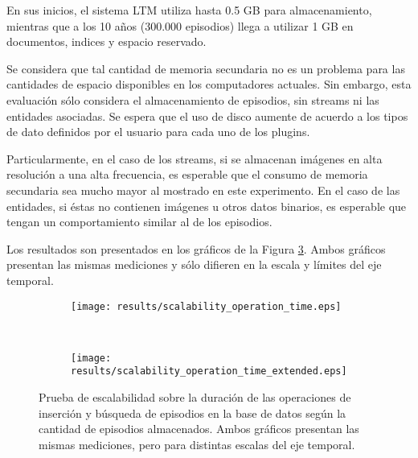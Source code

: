 En sus inicios, el sistema LTM utiliza hasta 0.5 GB para almacenamiento, mientras que a los 10 años (300.000 episodios) llega a utilizar 1 GB en documentos, indices y espacio reservado. 

Se considera que tal cantidad de memoria secundaria no es un problema para las cantidades de espacio disponibles en los computadores actuales. Sin embargo, esta evaluación sólo considera el almacenamiento de episodios, sin streams ni las entidades asociadas. Se espera que el uso de disco aumente de acuerdo a los tipos de dato definidos por el usuario para cada uno de los plugins. 

Particularmente, en el caso de los streams, si se almacenan imágenes en alta resolución a una alta frecuencia, es esperable que el consumo de memoria secundaria sea mucho mayor al mostrado en este experimento. En el caso de las entidades, si éstas no contienen imágenes u otros datos binarios, es esperable que tengan un comportamiento similar al de los episodios.



 Los resultados son presentados en los gráficos de la Figura \ref{result:scalability_time_usage}. Ambos gráficos presentan las mismas mediciones y sólo difieren en la escala y límites del eje temporal.

\begin{figure}[!ht]
	\centering
	\begin{subfigure}[b]{\graphwidth\textwidth}
		\texttt{[image: results/scalability\_operation\_time.eps]}
		\caption{}
		\label{result:scalability_time_usage_normal}
	\end{subfigure}
	~
	\begin{subfigure}[b]{\graphwidth\textwidth}
		\texttt{[image: results/scalability\_operation\_time\_extended.eps]}
		\caption{}
		\label{result:scalability_time_usage_extended}
	\end{subfigure}
	\caption[Escalabilidad: Duración de consultas según cantidad de episodios.]
	{\small Prueba de escalabilidad sobre la duración de las operaciones de inserción y búsqueda de episodios en la base de datos según la cantidad de episodios almacenados. Ambos gráficos presentan las mismas mediciones, pero para distintas escalas del eje temporal.}
	\label{result:scalability_time_usage}
\end{figure}

